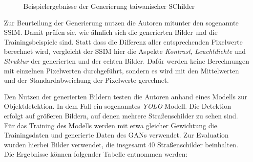 \begin{figure}[h]
\begin{subfigure}{0.125\textwidth}
    \end{subfigure}
       \caption{Beispielergebnisse der Generierung taiwanischer SChilder \cite{taiwanGAN}}
       \label{fig:taiwan-gen-schilder}
 \end{figure}

Zur Beurteilung der Generierung nutzen die Autoren mitunter den sogenannte \ac{SSIM}. Damit prüfen sie, wie ähnlich sich die generierten Bilder und die Trainingsbeispiele sind. Statt dass die Differenz aller entsprechenden Pixelwerte berechnet wird, vergleicht der \ac{SSIM} hier die Aspekte \emph{Kontrast}, \emph{Leuchtdichte} und \emph{Struktur} der generierten und der echten Bilder. Dafür werden keine Berechnungen mit einzelnen Pixelwerten durchgeführt, sondern es wird mit den Mittelwerten und der Standardabweichung der Pixelwerte gerechnet. \cite{taiwanGAN}

Den Nutzen der generierten Bildern testen die Autoren anhand eines Modells zur Objektdetektion. In dem Fall ein sogenanntes \emph{YOLO} Modell. Die Detektion erfolgt auf größeren Bildern, auf denen mehrere Straßenschilder zu sehen sind. Für das Training des Modells werden mit etwa gleicher Gewichtung die Trainingsdaten und generierte Daten des \acp{GAN} verwendet. Zur Evaluation wurden hierbei Bilder verwendet, die insgesamt 40 Straßenschilder beinhalten. Die Ergebnisse können folgender Tabelle entnommen werden: \cite{taiwanGAN}


